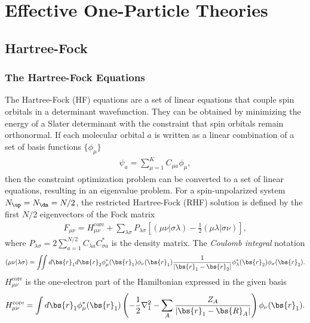 \section{Effective One-Particle Theories}
\subsection{Hartree-Fock}

\newcommand{\hcore}{H^{\text{core}}_{\mu\nu}}
\newcommand{\ksveff}{V^{\text{eff}}_{\mu\nu}}

\subsubsection{The Hartree-Fock Equations}
The Hartree-Fock (HF) equations are a set of linear equations that couple spin orbitals in a determinant wavefunction. They can be obtained by minimizing the energy of a Slater determinant with the constraint that spin orbitals remain orthonormal. If each molecular orbital $a$ is written as a linear combination of a set of basis functions $\{\phi_\mu\}$
\begin{align} \label{eq:hf-psia}
\psi_a = \sum\limits_{\mu=1}^K C_{\mu a} \phi_\mu,
\end{align}
then the constraint optimization problem can be converted to a set of linear equations, resulting in an eigenvalue problem.
For a spin-unpolarized system $N_{\up}=N_{\dn}=N/2$, the restricted Hartree-Fock (RHF) solution is defined by the first $N/2$ eigenvectors of the Fock matrix
\begin{align}
F_{\mu\nu} = \hcore + \sum\limits_{\lambda\sigma} P_{\lambda\sigma} \left[
(\mu\nu|\sigma\lambda) - \frac{1}{2}(\mu\lambda|\sigma\nu)
\right],
\end{align} %
where $P_{\lambda\sigma}=2\sum_{a=1}^{N/2} C_{\lambda a}C_{\sigma a}^*$ is the density matrix. The \textit{Coulomb integral} notation
\begin{align}
(\mu\nu|\lambda\sigma) = \iint d\bs{r}_1 d\bs{r}_2 \phi_\mu^*(\bs{r}_1)\phi_{\nu}(\bs{r}_1)
\frac{1}{\vert\bs{r}_1-\bs{r}_2\vert}
\phi_\lambda^*(\bs{r}_2)\phi_\sigma(\bs{r}_2).
\end{align}
$\hcore$ is the one-electron part of the Hamiltonian expressed in the given basis %
\begin{align}
\hcore = \int d\bs{r}_1 \phi_\mu^*(\bs{r}_1)\left(
-\frac{1}{2}\nabla_1^2-\sum\limits_A \dfrac{Z_A}{\vert\bs{r}_1-\bs{R}_A\vert}
\right)  \phi_\nu(\bs{r}_1).
\end{align}
